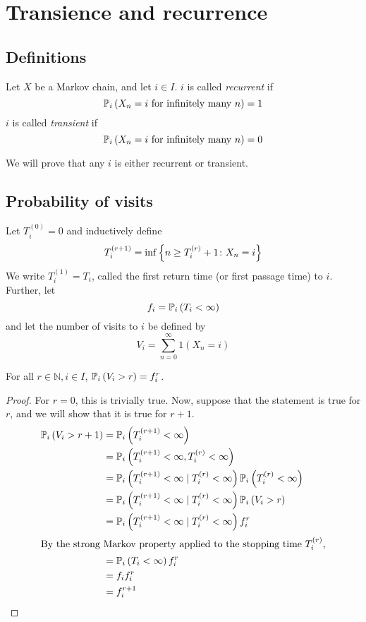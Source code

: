 \section{Transience and recurrence}
\subsection{Definitions}
\begin{definition}
	Let \( X \) be a Markov chain, and let \( i \in I \).
	\( i \) is called \textit{recurrent} if
	\[
		\mathbb{P}_{i}\left({X_n = i \text{ for infinitely many } n}\right) = 1
	\]
	\( i \) is called \textit{transient} if
	\[
		\mathbb{P}_{i}\left({X_n = i \text{ for infinitely many } n}\right) = 0
	\]
\end{definition}
\noindent We will prove that any \( i \) is either recurrent or transient.

\subsection{Probability of visits}
\begin{definition}
	Let \( T_i^{(0)} = 0 \) and inductively define
	\[
		T_i^{(r+1)} = \inf \qty{n \geq T_i^{(r)} + 1 \colon X_n = i}
	\]
	We write \( T_i^{(1)} = T_i \), called the first return time (or first passage time) to \( i \).
	Further, let
	\[
		f_i = \mathbb{P}_{i}\left({T_i < \infty}\right)
	\]
	and let the number of visits to \( i \) be defined by
	\[
		V_i = \sum_{n=0}^\infty 1(X_n = i)
	\]
\end{definition}
\begin{lemma}
	For all \( r \in \mathbb N, i \in I \), \( \mathbb{P}_{i}\left({V_i > r}\right) = f_i^r \).
\end{lemma}
\begin{proof}
	For \( r = 0 \), this is trivially true.
	Now, suppose that the statement is true for \( r \), and we will show that it is true for \( r + 1 \).
	\begin{align*}
		\mathbb{P}_{i}\left({V_i > r+1}\right) & = \mathbb{P}_{i}\left({T_i^{(r+1)} < \infty}\right)                                                      \\
		                    & = \mathbb{P}_{i}\left({T_i^{(r+1)} < \infty, T_i^{(r)} < \infty}\right)                                  \\
		                    & = \mathbb{P}_{i}\left({T_i^{(r+1)} < \infty \mid T_i^{(r)} < \infty}\right) \mathbb{P}_{i}\left({T_i^{(r)} < \infty}\right) \\
		                    & = \mathbb{P}_{i}\left({T_i^{(r+1)} < \infty \mid T_i^{(r)} < \infty}\right) \mathbb{P}_{i}\left({V_i > r}\right)            \\
		                    & = \mathbb{P}_{i}\left({T_i^{(r+1)} < \infty \mid T_i^{(r)} < \infty}\right) f_i^r                        \\
		\intertext{By the strong Markov property applied to the stopping time \( T_i^{(r)} \),}
		                    & = \mathbb{P}_{i}\left({T_i < \infty}\right) f_i^r                                                        \\
		                    & = f_i f_i^r                                                                           \\
		                    & = f_i^{r+1}
	\end{align*}
\end{proof}

